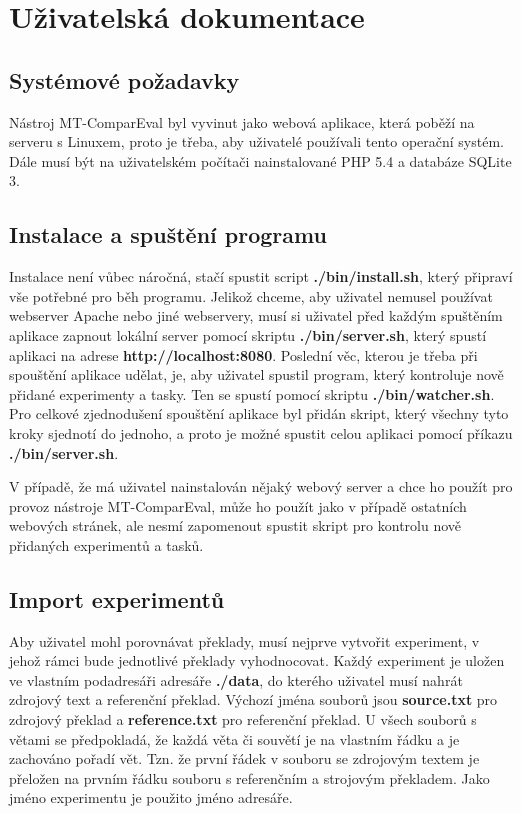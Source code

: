 \chapter{Uživatelská dokumentace}
\label{chap:users}

\section{Systémové požadavky}
Nástroj MT-ComparEval byl vyvinut jako webová aplikace,
  která poběží na serveru s Linuxem,
  proto je třeba,
  aby uživatelé používali tento operační systém.
Dále musí být na uživatelském počítači nainstalované PHP 5.4 a databáze SQLite 3.

\section{Instalace a spuštění programu}
Instalace není vůbec náročná,
  stačí spustit script \textbf{./bin/install.sh},
  který připraví vše potřebné pro běh programu. 
Jelikož chceme,
  aby uživatel nemusel používat webserver Apache nebo jiné webservery,
  musí si uživatel před každým spuštěním aplikace zapnout lokální server pomocí skriptu \textbf{./bin/server.sh},
  který spustí aplikaci na adrese \textbf{http://localhost:8080}.
Poslední věc,
  kterou je třeba při spouštění aplikace udělat, je,
  aby uživatel spustil program,
  který kontroluje nově přidané experimenty a tasky.
Ten se spustí pomocí skriptu \textbf{./bin/watcher.sh}.
Pro celkové zjednodušení spouštění aplikace byl přidán skript,
  který všechny tyto kroky sjednotí do jednoho,
  a proto je možné spustit celou aplikaci pomocí příkazu \textbf{./bin/server.sh}.

V případě, že má uživatel nainstalován nějaký webový server
  a chce ho použít pro provoz nástroje MT-ComparEval,
  může ho použít jako v případě ostatních webových stránek,
  ale nesmí zapomenout spustit skript pro kontrolu nově přidaných experimentů a tasků.

\section{Import experimentů}
Aby uživatel mohl porovnávat překlady,
  musí nejprve vytvořit experiment,
  v jehož rámci bude jednotlivé překlady vyhodnocovat.
Každý experiment je uložen ve vlastním podadresáři adresáře \textbf{./data},
  do kterého uživatel musí nahrát zdrojový text a referenční překlad.
Výchozí jména souborů jsou \textbf{source.txt} pro zdrojový překlad
  a \textbf{reference.txt} pro referenční překlad.
U všech souborů s větami se předpokladá,
  že každá věta či souvětí je na vlastním řádku
  a je zachováno pořadí vět.
Tzn. že první řádek v souboru se zdrojovým textem je přeložen na prvním řádku souboru s referenčním a strojovým překladem.
Jako jméno experimentu je použito jméno adresáře.

